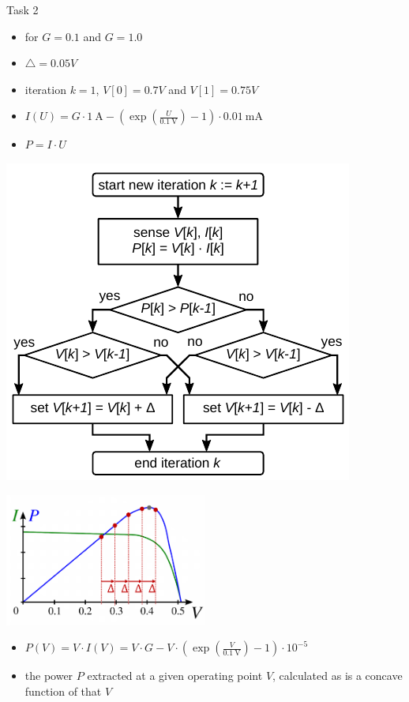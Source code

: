 \begin{frame}[allowframebreaks]{Task 2}{}
  \begin{tasknoinc}
    \begin{itemize}
      \item for $G=0.1$ and $G=1.0$
      \item $\triangle = 0.05V$
      \item iteration $k=1$, $V[0] = 0.7V$ and $V[1]=0.75V$
    \end{itemize}
  \end{tasknoinc}
  \begin{requirementsnoinc}
    \begin{itemize}
      \item $I(U)=G \cdot 1 \mathrm{~A}-\left(\exp \left(\frac{U}{0.1 \mathrm{~V}}\right)-1\right) \cdot 0.01 \mathrm{~mA}$
      \item $P = I \cdot U$
    \end{itemize}
    \centering
    \includegraphics[height=0.3\textwidth]{./figures/task2_maximal_power_point_tracking.png}
  \end{requirementsnoinc}
  \begin{requirementsnoinc}
    \centering
    \includegraphics[width=0.5\textwidth]{./figures/task2_power_and_voltage.png}
  \end{requirementsnoinc}
  \begin{requirementsnoinc}
    \begin{itemize}
       \item $P(V)=V \cdot I(V)=V \cdot G-V \cdot\left(\exp \left(\frac{V}{0.1 \mathrm{~V}}\right)-1\right) \cdot 10^{-5}$
       \item the power $P$ extracted at a given operating point $V$, calculated as is a concave function of that $V$

\end{itemize}
\end{requirementsnoinc}
\end{frame}
